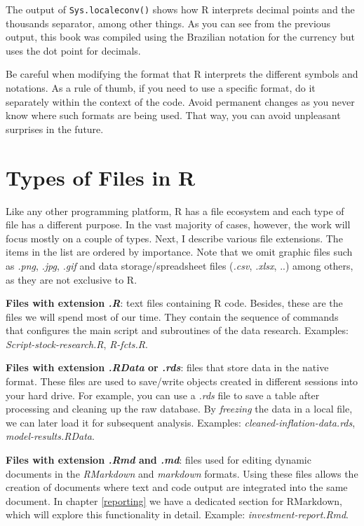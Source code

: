 \documentclass[
  12pt,
]{book}
\newenvironment{rmdcaution}
{\begin{cautionblock}
		
	} {\end{cautionblock}}
\begin{document}
The output of \texttt{Sys.localeconv()} shows how R interprets decimal points and the thousands separator, among other things. As you can see from the previous output, this book was compiled using the Brazilian notation for the currency but uses the dot point for decimals.

\begin{rmdcaution}
Be careful when modifying the format that R interprets the different
symbols and notations. As a rule of thumb, if you need to use a specific
format, do it separately within the context of the code. Avoid permanent
changes as you never know where such formats are being used. That way,
you can avoid unpleasant surprises in the future.
\end{rmdcaution}

\hypertarget{types-of-files-in-r}{%
\section{Types of Files in R}\label{types-of-files-in-r}}

Like any other programming platform, R has a file ecosystem and each type of file has a different purpose. In the vast majority of cases, however, the work will focus mostly on a couple of types. Next, I describe various file extensions. The items in the list are ordered by importance. Note that we omit graphic files such as \emph{.png}, \emph{.jpg}, \emph{.gif} and data storage/spreadsheet files (\emph{.csv}, \emph{.xlsx}, ..) among others, as they are not exclusive to R.    

\textbf{Files with extension \emph{.R}}: text files containing R code. Besides, these are the files we will spend most of our time. They contain the sequence of commands that configures the main script and subroutines of the data research. Examples: \emph{Script-stock-research.R}, \emph{R-fcts.R}.

\textbf{Files with extension \emph{.RData} or \emph{.rds}}: files that store data in the native format. These files are used to save/write objects created in different sessions into your hard drive. For example, you can use a \emph{.rds} file to save a table after processing and cleaning up the raw database. By \emph{freezing} the data in a local file, we can later load it for subsequent analysis. Examples: \emph{cleaned-inflation-data.rds}, \emph{model-results.RData}.

\textbf{Files with extension \emph{.Rmd} and \emph{.md}}: files used for editing dynamic documents in the \emph{RMarkdown} and \emph{markdown} formats. Using these files allows the creation of documents where text and code output are integrated into the same document. In chapter \ref{reporting} we have a dedicated section for RMarkdown, which will explore this functionality in detail. Example: \emph{investment-report.Rmd}.  
\end{document}
